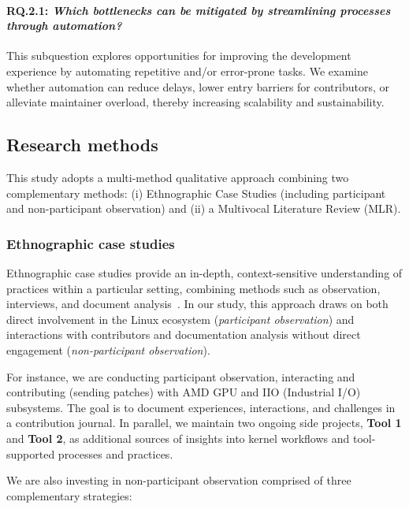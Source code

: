 \documentclass[sigconf]{acmart} %
\begin{document}
\paragraph{\textbf{RQ.2.1}: \textit{Which bottlenecks can be mitigated by
streamlining processes through automation?}} This subquestion explores
opportunities for improving the development experience by automating repetitive
and/or error-prone tasks. We examine whether automation can reduce delays, lower
entry barriers for contributors, or alleviate maintainer overload, thereby
increasing scalability and sustainability.



\subsection{Research methods}

This study adopts a multi-method qualitative approach combining two
complementary methods: (i) Ethnographic Case Studies (including participant and
non-participant observation) and (ii) a Multivocal Literature Review (MLR).

\subsubsection{Ethnographic case studies}

Ethnographic case studies provide an in-depth, context-sensitive understanding
of practices within a particular setting, combining methods such as observation,
interviews, and document analysis~\cite{edmonds2017-research-design}. In our
study, this approach draws on both direct involvement in the Linux ecosystem
(\textit{participant observation}) and interactions with contributors and
documentation analysis without direct engagement (\textit{non-participant
observation}).

For instance, we are conducting participant observation, interacting and
contributing (sending patches) with AMD GPU and IIO (Industrial I/O) subsystems.
The goal is to document experiences, interactions, and challenges in a
contribution journal. In parallel, we maintain two ongoing side projects,
\textbf{Tool 1} and \textbf{Tool 2}, as additional sources of insights into
kernel workflows and tool-supported processes and practices.

We are also investing in non-participant observation comprised of three
complementary strategies:
\end{document}
